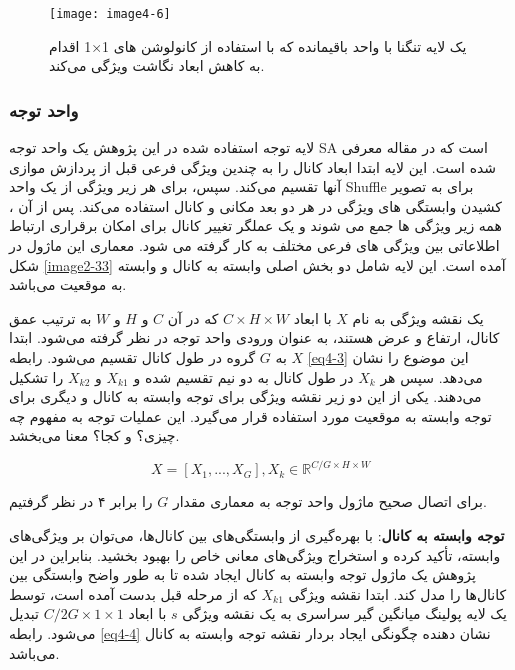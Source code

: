 \begin{figure}[h]
\centering
  \texttt{[image: image4-6]}
  \caption{یک لایه تنگنا با واحد باقیمانده که با استفاده از کانولوشن های 1×1 اقدام به کاهش ابعاد نگاشت ویژگی می‌کند.}
  \label{image4-6}
\end{figure}

\subsubsection{واحد توجه}
لایه توجه استفاده شده در این پژوهش یک واحد توجه SA  است که در مقاله \cite{yang2021sanet} معرفی شده است. این لایه ابتدا ابعاد کانال را به چندین ویژگی فرعی قبل از پردازش موازی آنها تقسیم می‌کند. سپس، برای هر زیر ویژگی از یک واحد Shuffle برای به تصویر کشیدن وابستگی های ویژگی در هر دو بعد مکانی و کانال استفاده می‌کند. پس از آن ، همه زیر ویژگی ها جمع می شوند و یک عملگر تغییر کانال برای امکان برقراری ارتباط اطلاعاتی بین ویژگی های فرعی مختلف به کار گرفته می شود. معماری این ماژول در شکل \ref{image2-33} آمده است. این لایه شامل دو بخش اصلی وابسته به کانال  و وابسته به موقعیت   می‌باشد. 

\noindent
یک نقشه ویژگی  به نام $X$ با ابعاد $C \times H \times W$ که در آن $C$ و $H$ و $W$ به ترتیب عمق کانال، ارتفاع و عرض هستند، به عنوان ورودی واحد توجه در نظر گرفته می‌شود. ابتدا $X$ به $G$ گروه در طول کانال تقسیم می‌شود. رابطه \ref{eq4-3} این موضوع را نشان می‌دهد. سپس هر $X_k$ در طول کانال به دو نیم تقسیم شده و $X_{k1}$ و $X_{k2}$ را تشکیل می‌دهند. یکی از این دو زیر نقشه ویژگی   برای توجه وابسته به کانال و دیگری برای توجه وابسته به موقعیت مورد استفاده قرار می‌گیرد. این عملیات توجه به مفهوم چه چیزی؟ و کجا؟ معنا می‌بخشد. 

\begin{equation}
X = [X_1, ..., X_G], X_k \in \mathbb{R}^{C/G \times H \times W}
\label{eq4-3}
\end{equation}

\noindent
برای اتصال صحیح ماژول واحد توجه به معماری  مقدار $G$ را برابر ۴ در نظر گرفتیم.

\textbf{توجه  وابسته به کانال}: 
با بهره‌گیری از وابستگی‌های بین کانال‌ها، می‌توان بر ویژگی‌های وابسته، تأکید کرده و استخراج ویژگی‌های معانی خاص را بهبود بخشید. بنابراین در این پژوهش یک ماژول توجه وابسته به کانال ایجاد شده تا به طور واضح وابستگی بین کانال‌ها را مدل کند. ابتدا نقشه ویژگی $X_{k1}$ که از مرحله قبل بدست آمده است، توسط یک لایه پولینگ میانگین گیر سراسری  به یک نقشه ویژگی $s$ با ابعاد $C/2G \times 1 \times 1$ تبدیل می‌شود. رابطه \ref{eq4-4} نشان دهنده چگونگی ایجاد بردار نقشه توجه وابسته به کانال می‌باشد. 

